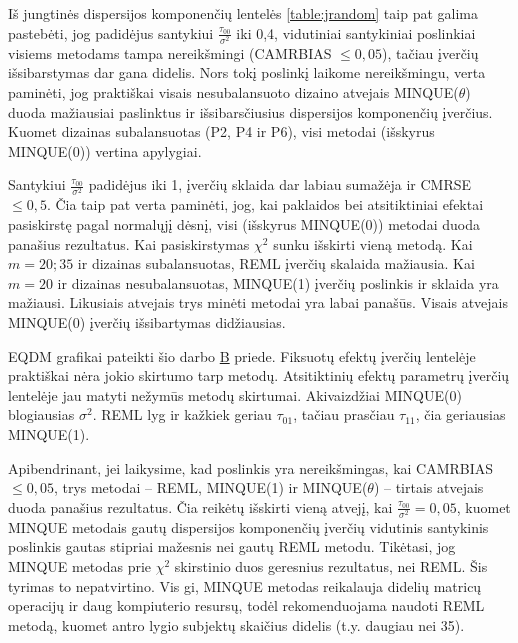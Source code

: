\documentclass[11pt,a4paper]{article}
\begin{document}
\indent Iš jungtinės dispersijos komponenčių lentelės \ref{table:jrandom} taip pat galima pastebėti, jog padidėjus santykiui $\frac{\tau_{00}}{\sigma^2}$ iki 0,4, vidutiniai santykiniai poslinkiai visiems metodams tampa nereikšmingi (CAMRBIAS $\leq 0,05$), tačiau įverčių išsibarstymas dar gana didelis. Nors tokį poslinkį laikome nereikšmingu, verta paminėti, jog praktiškai visais nesubalansuoto dizaino atvejais MINQUE($\theta$) duoda mažiausiai paslinktus ir išsibarsčiusius dispersijos komponenčių įverčius. Kuomet dizainas subalansuotas (P2, P4 ir P6), visi metodai (išskyrus MINQUE(0)) vertina apylygiai.

\indent Santykiui $\frac{\tau_{00}}{\sigma^2}$ padidėjus iki 1, įverčių sklaida dar labiau sumažėja ir CMRSE $\leq 0,5$. Čia taip pat verta paminėti, jog, kai paklaidos bei atsitiktiniai efektai pasiskirstę pagal normalųjį dėsnį, visi (išskyrus MINQUE(0)) metodai duoda panašius rezultatus. Kai pasiskirstymas $\chi^2$ sunku išskirti vieną metodą. Kai $m=20;35$ ir dizainas subalansuotas,  REML įverčių skalaida mažiausia. Kai $m=20$ ir dizainas nesubalansuotas, MINQUE(1) įverčių poslinkis ir sklaida yra mažiausi. Likusiais atvejais trys minėti metodai yra labai panašūs. Visais atvejais MINQUE(0) įverčių išsibartymas didžiausias.

\indent EQDM grafikai pateikti šio darbo \hyperlink{appendixb}{B} priede. Fiksuotų efektų įverčių lentelėje praktiškai nėra jokio skirtumo tarp metodų. Atsitiktinių efektų parametrų įverčių lentelėje jau matyti nežymūs metodų skirtumai. Akivaizdžiai MINQUE(0) blogiausias $\sigma^2$. REML lyg ir kažkiek geriau $\tau_{01}$, tačiau prasčiau $\tau_{11}$, čia geriausias MINQUE(1). 

\indent Apibendrinant, jei laikysime, kad poslinkis yra nereikšmingas, kai CAMRBIAS $\leq 0,05$, trys metodai -- REML, MINQUE(1) ir 
MINQUE($\theta$) -- tirtais atvejais duoda panašius rezultatus. Čia reikėtų išskirti vieną atvejį, kai $\frac{\tau_{00}}{\sigma^2}=0,05$, kuomet MINQUE metodais gautų dispersijos komponenčių įverčių vidutinis santykinis poslinkis gautas stipriai mažesnis nei gautų REML metodu. 
\indent Tikėtasi, jog MINQUE metodas prie $\chi^2$ skirstinio duos geresnius rezultatus, nei REML. Šis tyrimas to nepatvirtino. Vis gi, MINQUE metodas reikalauja didelių matricų operacijų ir daug kompiuterio resursų, todėl rekomenduojama naudoti REML metodą, kuomet antro lygio subjektų skaičius didelis (t.y. daugiau nei 35).
\end{document}
